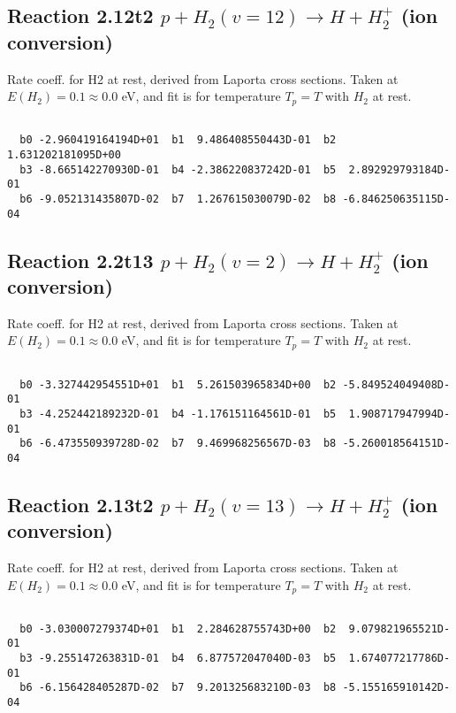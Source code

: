 \documentclass[12pt,dvipdfmx]{article}
\begin{document}
\newpage
\subsection{
Reaction 2.12t2
$ p + H_2(v=12) \rightarrow H + H_2^+$ (ion conversion)
}
Rate coeff. for H2 at rest, derived from Laporta cross sections.
Taken at $E(H_2) = 0.1 \approx 0.0$ eV,  and fit is for temperature $T_p=T$ with $H_2$ at rest.

\begin{small}\begin{verbatim}

  b0 -2.960419164194D+01  b1  9.486408550443D-01  b2  1.631202181095D+00
  b3 -8.665142270930D-01  b4 -2.386220837242D-01  b5  2.892929793184D-01
  b6 -9.052131435807D-02  b7  1.267615030079D-02  b8 -6.846250635115D-04

\end{verbatim}\end{small}

\newpage
\subsection{
Reaction 2.2t13
$ p + H_2(v=2) \rightarrow H + H_2^+$ (ion conversion)
}
Rate coeff. for H2 at rest, derived from Laporta cross sections.
Taken at $E(H_2) = 0.1 \approx 0.0$ eV,  and fit is for temperature $T_p=T$ with $H_2$ at rest.

\begin{small}\begin{verbatim}

  b0 -3.327442954551D+01  b1  5.261503965834D+00  b2 -5.849524049408D-01
  b3 -4.252442189232D-01  b4 -1.176151164561D-01  b5  1.908717947994D-01
  b6 -6.473550939728D-02  b7  9.469968256567D-03  b8 -5.260018564151D-04

\end{verbatim}\end{small}

\newpage
\subsection{
Reaction 2.13t2
$ p + H_2(v=13) \rightarrow H + H_2^+$ (ion conversion)
}
Rate coeff. for H2 at rest, derived from Laporta cross sections.
Taken at $E(H_2) = 0.1 \approx 0.0$ eV,  and fit is for temperature $T_p=T$ with $H_2$ at rest.

\begin{small}\begin{verbatim}

  b0 -3.030007279374D+01  b1  2.284628755743D+00  b2  9.079821965521D-01
  b3 -9.255147263831D-01  b4  6.877572047040D-03  b5  1.674077217786D-01
  b6 -6.156428405287D-02  b7  9.201325683210D-03  b8 -5.155165910142D-04

\end{verbatim}\end{small}
\end{document}
